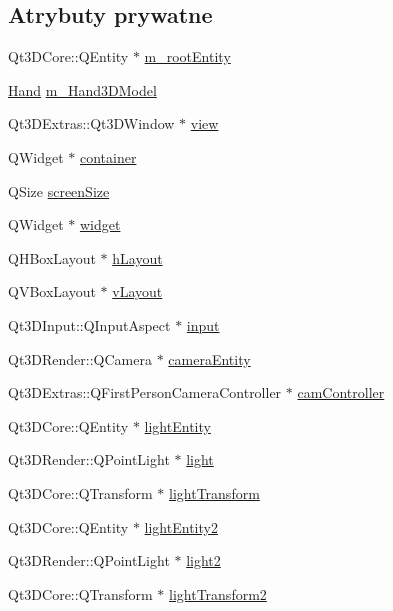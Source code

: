 \subsection*{Atrybuty prywatne}
\begin{DoxyCompactItemize}
\item 
Qt3\+D\+Core\+::\+Q\+Entity $\ast$ \hyperlink{class_scene_a1ef7f61aed73e150dfb7ef7ffc47f7c2}{m\+\_\+root\+Entity}
\item 
\hyperlink{class_hand}{Hand} \hyperlink{class_scene_adf272488e380e731a1c20fa5cd208490}{m\+\_\+\+Hand3\+D\+Model}
\item 
Qt3\+D\+Extras\+::\+Qt3\+D\+Window $\ast$ \hyperlink{class_scene_a3b76fefe111a22aa56f066783fa76bc1}{view}
\item 
Q\+Widget $\ast$ \hyperlink{class_scene_a10832d33619bdb86c51bb75377ea649d}{container}
\item 
Q\+Size \hyperlink{class_scene_a2bb58c1253bd4d64781a2b9e25604060}{screen\+Size}
\item 
Q\+Widget $\ast$ \hyperlink{class_scene_aa6f9d0915a83b6d5e5083c439627ff06}{widget}
\item 
Q\+H\+Box\+Layout $\ast$ \hyperlink{class_scene_a285ea7ad07d9419d79fccbde3a9f8388}{h\+Layout}
\item 
Q\+V\+Box\+Layout $\ast$ \hyperlink{class_scene_adae30f81725ed3f2258bee8fe5e90c5d}{v\+Layout}
\item 
Qt3\+D\+Input\+::\+Q\+Input\+Aspect $\ast$ \hyperlink{class_scene_aa17e5d3b3393d6ea4cbbf7ab981b5b62}{input}
\item 
Qt3\+D\+Render\+::\+Q\+Camera $\ast$ \hyperlink{class_scene_aed08c4ba793fa5d32104d47c9cfd2c5c}{camera\+Entity}
\item 
Qt3\+D\+Extras\+::\+Q\+First\+Person\+Camera\+Controller $\ast$ \hyperlink{class_scene_a55d0f4c21e5ac40b4ad53a67bf851ff7}{cam\+Controller}
\item 
Qt3\+D\+Core\+::\+Q\+Entity $\ast$ \hyperlink{class_scene_a932f32946da0283ac184a28cb13f4427}{light\+Entity}
\item 
Qt3\+D\+Render\+::\+Q\+Point\+Light $\ast$ \hyperlink{class_scene_ac2f294ceccf5b708d6dcdd540e51d787}{light}
\item 
Qt3\+D\+Core\+::\+Q\+Transform $\ast$ \hyperlink{class_scene_a24f2698364e45c011a80c51747a62bae}{light\+Transform}
\item 
Qt3\+D\+Core\+::\+Q\+Entity $\ast$ \hyperlink{class_scene_a9ad241dc981470f63bb5d7a5bd25888e}{light\+Entity2}
\item 
Qt3\+D\+Render\+::\+Q\+Point\+Light $\ast$ \hyperlink{class_scene_a7a9feb72cc710357f6166f5ec45369cd}{light2}
\item 
Qt3\+D\+Core\+::\+Q\+Transform $\ast$ \hyperlink{class_scene_af5b3d0a98c256da599ddd8973016b10b}{light\+Transform2}
\end{DoxyCompactItemize}



